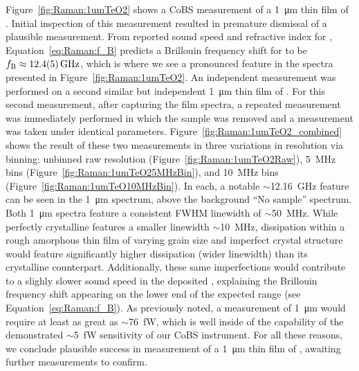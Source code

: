Figure~\ref{fig:Raman:1umTeO2} shows a \ac{CoBS} measurement of a \SI{1}{\micro\meter} thin film of . Initial inspection of this measurement resulted in premature dismissal of a plausible measurement. From reported sound speed and refractive index for , \cite{uchida1969elastic, schweppe1970elastic, ohmachi1972acoustic, peercy1975temperature, fleury2018non, harris1991multichannel, uchida1971optical} Equation~\ref{eq:Raman:f_B} predicts a Brillouin frequency shift for  to be \(f_{\rm B}\approx\SI{12.4(0.5)}{\giga\hertz}\), which is where we see a pronounced feature in the spectra presented in Figure~\ref{fig:Raman:1umTeO2}. An independent measurement was performed on a second similar but independent \SI{1}{\micro\meter} thin film of . For this second measurement, after capturing the  film spectra, a repeated measurement was immediately performed in which the  sample was removed and a measurement was taken under identical parameters. Figure~\ref{fig:Raman:1umTeO2_combined} shows the result of these two measurements in three variations in resolution via binning: unbinned raw resolution (Figure~\ref{fig:Raman:1umTeO2Raw}), \SI{5}{\mega\hertz} bins (Figure~\ref{fig:Raman:1umTeO25MHzBin}), and \SI{10}{\mega\hertz} bins (Figure~\ref{fig:Raman:1umTeO10MHzBin}). In each, a notable \(\sim\)\SI{12.16}{\giga\hertz} feature can be seen in the \SI{1}{\micro\meter}  spectrum, above the background ``No sample'' spectrum. Both \SI{1}{\micro\meter}  spectra feature a consistent \ac{FWHM} linewidth of \(\sim\)\SI{50}{\mega\hertz}. While perfectly crystalline  features a smaller linewidth \(\sim\)\SI{10}{\mega\hertz}, \cite{renninger2018bulk} dissipation within a rough amorphous thin film of varying grain size and imperfect crystal structure would feature significantly higher dissipation (wider linewidth) than its crystalline counterpart. Additionally, these same imperfections would contribute to a slighly slower sound speed in the deposited , explaining the Brillouin frequency shift appearing on the lower end of the expected range (see Equation~\ref{eq:Raman:f_B}). As previously noted, a measurement of \SI{1}{\micro\meter}  would require at least as great as \(\sim\)\SI{76}{\femto\watt}, which is well inside of the capability of the demonstrated \(\sim\)\SI{5}{\femto\watt} sensitivity of our \ac{CoBS} instrument. For all these reasons, we conclude plausible success in measurement of a \SI{1}{\micro\meter} thin film of , awaiting further measurements to confirm.

